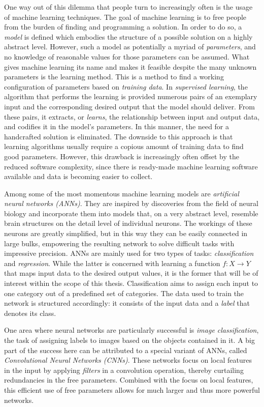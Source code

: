 \documentclass[11pt, a4paper]{article}
\begin{document}
One way out of this dilemma that people turn to increasingly often is the usage of machine learning techniques. The goal of machine learning is to free people from the burden of finding and programming a solution. In order to do so, a \emph{model} is defined which embodies the structure of a possible solution on a highly abstract level. However, such a model as potentially a myriad of \emph{parameters}, and no knowledge of reasonable values for those parameters can be assumed. What gives machine learning its name and makes it feasible despite the many unknown parameters is the learning method. This is a method to find a working configuration of parameters based on \emph{training data}. In \emph{supervised learning}, the algorithm that performs the learning is provided numerous pairs of an exemplary input and the corresponding desired output that the model should deliver. From these pairs, it extracts, or \emph{learns}, the relationship between input and output data, and codifies it in the model's parameters. In this manner, the need for a handcrafted solution is eliminated. The downside to this approach is that learning algorithms usually require a copious amount of training data to find good parameters. However, this drawback is increasingly often offset by the reduced software complexity, since  there is ready-made machine learning software available and data is becoming easier to collect.

Among some of the most momentous machine learning models are \emph{artificial neural networks (ANNs)}. They are inspired by discoveries from the field of neural biology and incorporate them into models that, on a very abstract level, resemble brain structures on the detail level of individual neurons. The workings of these  neurons are greatly simplified, but in this way they can be easily connected in large bulks, empowering the resulting network to solve difficult tasks with impressive precision. ANNs are mainly used for two types of tasks: \emph{classification} and \emph{regression}. While the latter is concerned with learning a function $f: X \rightarrow Y$ that maps input data to the desired output values, it is the former that will be of interest within the scope of this thesis. Classification aims to assign each input to one category out of a predefined set of categories. The data used to train the network is structured accordingly: it consists of the input data and a \emph{label} that denotes its class.

One area where neural networks are particularly successful is \emph{image classification}, the task of assigning labels to images based on the objects contained in it. A big part of the success here can be attributed to a special variant of ANNs, called \emph{Convolutional Neural Networks (CNNs)}. These networks focus on local features in the input by applying \emph{filters} in a convolution operation, thereby curtailing redundancies in the free parameters. Combined with the focus on local features, this efficient use of free parameters allows for much larger and thus more powerful networks.
\end{document}
